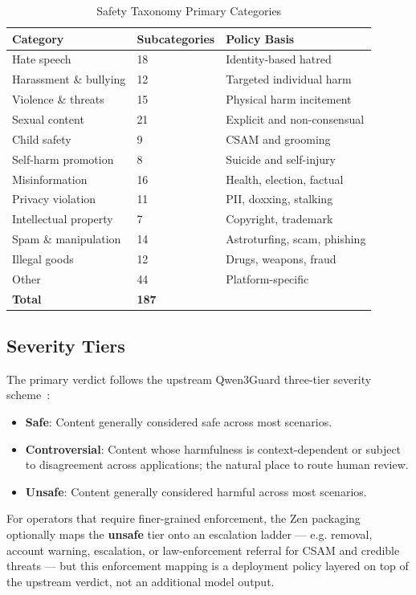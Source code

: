 \documentclass[11pt,a4paper]{article}
\begin{document}
\begin{table}[H]
\centering
\caption{Safety Taxonomy Primary Categories}
\begin{tabular}{lll}
\toprule
\textbf{Category} & \textbf{Subcategories} & \textbf{Policy Basis} \\
\midrule
Hate speech & 18 & Identity-based hatred \\
Harassment \& bullying & 12 & Targeted individual harm \\
Violence \& threats & 15 & Physical harm incitement \\
Sexual content & 21 & Explicit and non-consensual \\
Child safety & 9 & CSAM and grooming \\
Self-harm promotion & 8 & Suicide and self-injury \\
Misinformation & 16 & Health, election, factual \\
Privacy violation & 11 & PII, doxxing, stalking \\
Intellectual property & 7 & Copyright, trademark \\
Spam \& manipulation & 14 & Astroturfing, scam, phishing \\
Illegal goods & 12 & Drugs, weapons, fraud \\
Other & 44 & Platform-specific \\
\midrule
\textbf{Total} & \textbf{187} & \\
\bottomrule
\end{tabular}
\end{table}

\subsection{Severity Tiers}

The primary verdict follows the upstream Qwen3Guard three-tier severity
scheme~\cite{qwen3guard}:

\begin{itemize}
  \item \textbf{Safe}: Content generally considered safe across most scenarios.
  \item \textbf{Controversial}: Content whose harmfulness is context-dependent or subject to disagreement across applications; the natural place to route human review.
  \item \textbf{Unsafe}: Content generally considered harmful across most scenarios.
\end{itemize}

For operators that require finer-grained enforcement, the Zen packaging optionally maps the
\textbf{unsafe} tier onto an escalation ladder --- e.g. removal, account warning, escalation,
or law-enforcement referral for CSAM and credible threats --- but this enforcement mapping is a
deployment policy layered on top of the upstream verdict, not an additional model output.
\end{document}
